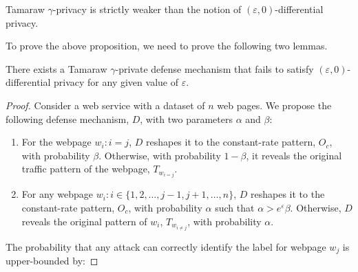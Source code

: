 \begin{proposition}
  Tamaraw $\gamma$-privacy is strictly weaker than the notion of $(\varepsilon, 0)$-differential privacy.
\end{proposition}
\noindent
To prove the above proposition, we need to prove the following two lemmas.

\begin{lemma-numbered}
  There exists a Tamaraw $\gamma$-private defense mechanism that fails to satisfy $(\varepsilon, 0)$-differential privacy for any given value of $\varepsilon$.
\end{lemma-numbered}
\begin{proof}
    Consider a web service with a dataset of $n$ web pages.
    We propose the following defense mechanism, $D$, with two parameters $\alpha$ and $\beta$:
    \begin{enumerate}
    \item For the webpage $w_i: i=j$, $D$ reshapes it to the constant-rate pattern, $O_c$, with probability $\beta$. Otherwise, with probability $1-\beta$, it reveals the original traffic pattern of the webpage, $T_{w_{i=j}}$.
    \item For any webpage $w_i: i \in \{1, 2, \dots, j-1, j+1, \dots, n\}$, $D$ reshapes it to the constant-rate pattern, $O_c$, with probability $\alpha$ such that $\alpha > {e^{\varepsilon}}\beta$. Otherwise, $D$ reveals the original pattern of $w_i$, $T_{w_{i\neq j}}$, with probability $\alpha$.
    \end{enumerate}
    The probability that any attack can correctly identify the label for webpage $w_j$ is upper-bounded by:


\end{proof}
